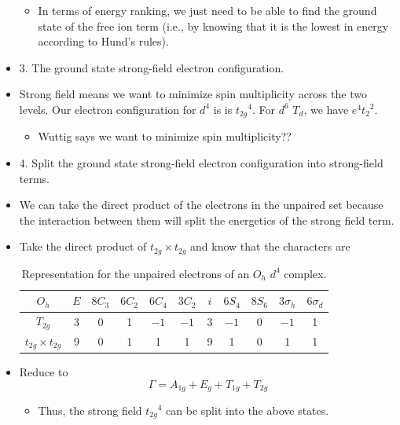 \documentclass[../notes.tex]{subfiles}
\begin{document}
\begin{itemize}
    \begin{itemize}
        \item In terms of energy ranking, we just need to be able to find the ground state of the free ion term (i.e., by knowing that it is the lowest in energy according to Hund's rules).
    \end{itemize}
    \item 3. The ground state strong-field electron configuration.
    \item Strong field means we want to minimize spin multiplicity across the two levels. Our electron configuration for $d^4$ is is ${t_{2g}}^4$. For $d^6$ $T_d$, we have $e^4{t_2}^2$.
    \begin{itemize}
        \item Wuttig says we want to minimize spin multiplicity??
    \end{itemize}
    \item 4. Split the ground state strong-field electron configuration into strong-field terms.
    \item We can take the direct product of the electrons in the unpaired set because the interaction between them will split the energetics of the strong field term.
    \item Take the direct product of $t_{2g}\times t_{2g}$ and know that the characters are
    \begin{table}[h!]
        \centering
        \small
        \renewcommand{\arraystretch}{1.2}
        \begin{tabular}{c|cccccccccc}
            $O_h$ & $E$ & $8C_3$ & $6C_2$ & $6C_4$ & $3C_2$ & $i$ & $6S_4$ & $8S_6$ & $3\sigma_h$ & $6\sigma_d$\\
            \hline
            $T_{2g}$ & 3 & 0 & 1 & $-1$ & $-1$ & 3 & $-1$ & 0 & $-1$ & 1\\
            $t_{2g}\times t_{2g}$ & 9 & 0 & 1 & 1 & 1 & 9 & 1 & 0 & 1 & 1
        \end{tabular}
        \caption{Representation for the unpaired electrons of an $O_h$ $d^4$ complex.}
        \label{tab:Ohd4RR}
    \end{table}
    \item Reduce to
    \begin{equation*}
        \Gamma = A_{1g}+E_g+T_{1g}+T_{2g}
    \end{equation*}
    \begin{itemize}
        \item Thus, the strong field ${t_{2g}}^4$ can be split into the above states.

\end{itemize}
\end{itemize}
\end{document}
